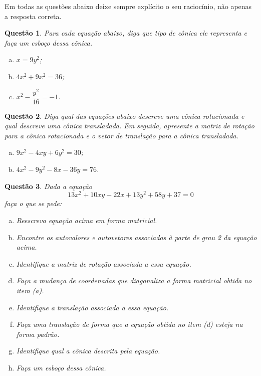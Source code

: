 \documentclass[a4paper,12pt]{article}
\author{``3º Testinho'' - GAAL}
\date{18 de Junho de 2019}
\title{}
\newtheorem{qst}{Questão}
\begin{document}
\maketitle

Em todas as questões abaixo deixe sempre explícito o seu raciocínio, não apenas a resposta correta.

\begin{qst}
Para cada equação abaixo, diga que tipo de cônica ele representa e faça um esboço dessa cônica.
\begin{enumerate}[a)]
	\item $x=9y^2$;
	\item $4x^2+9x^2=36$;
	\item $x^2-\dfrac{y^2}{16}=-1$.
\end{enumerate}
\end{qst}
\begin{qst}
	Diga qual das equações abaixo descreve uma cônica rotacionada e qual descreve uma cônica transladada. Em seguida, apresente a matriz de rotação para a cônica rotacionada e o vetor de translação para a cônica transladada.
	\begin{enumerate}[a)]
		\item $9x^2-4xy+6y^2=30$;
		\item $4x^2-9y^2-8x-36y=76$.
	\end{enumerate}
\end{qst}

\begin{qst}	
	Dada a equação \[13 x^2 + 10 x y - 22 x + 13 y^2 + 58 y + 37 = 0\]faça o que se pede:
	\begin{enumerate}[a)]
		\item Reescreva equação acima em forma matricial.
		\item Encontre os autovalores e autovetores associados à parte de grau 2 da equação acima.
		\item Identifique a matriz de rotação associada a essa equação.
		\item Faça a mudança de coordenadas que diagonaliza a forma matricial obtida no item (a).
		\item Identifique a translação associada a essa equação.
		\item Faça uma translação de forma que a equação obtida no item (d) esteja na forma padrão.
		\item Identifique qual a cônica descrita pela equação.
		\item Faça um esboço dessa cônica.
	\end{enumerate}
\end{qst}
\end{document}
